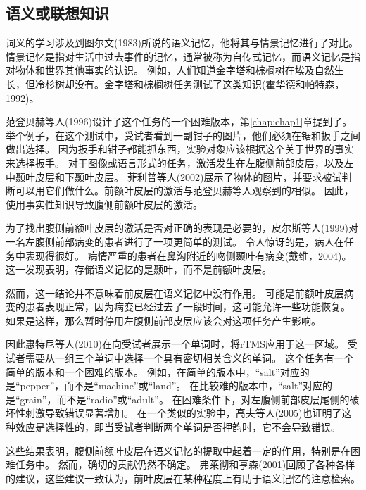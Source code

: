 \subsection{语义或联想知识}
\par
词义的学习涉及到图尔文(1983)所说的语义记忆，他将其与情景记忆进行了对比。
情景记忆是指对生活中过去事件的记忆，通常被称为自传式记忆，而语义记忆是指对物体和世界其他事实的认识。
例如，人们知道金字塔和棕榈树在埃及自然生长，但冷杉树却没有。金字塔和棕榈树任务测试了这类知识(霍华德和帕特森，1992)。
\par


范登贝赫等人(1996)设计了这个任务的一个困难版本，第\ref{chap:chap1}章提到了。
举个例子，在这个测试中，受试者看到一副钳子的图片，他们必须在锯和扳手之间做出选择。
因为扳手和钳子都能抓东西，实验对象应该根据这个关于世界的事实来选择扳手。
对于图像或语言形式的任务，激活发生在左腹侧前部皮层，以及左中颞叶皮层和下颞叶皮层。
菲利普等人(2002)展示了物体的图片，并要求被试判断可以用它们做什么。前额叶皮层的激活与范登贝赫等人观察到的相似。
因此，使用事实性知识导致腹侧前额叶皮层的激活。
\par


为了找出腹侧前额叶皮层的激活是否对正确的表现是必要的，皮尔斯等人(1999)对一名左腹侧前部病变的患者进行了一项更简单的测试。
令人惊讶的是，病人在任务中表现得很好。
病情严重的患者在鼻沟附近的吻侧颞叶有病变(戴维，2004)。
这一发现表明，存储语义记忆的是颞叶，而不是前额叶皮层。
\par


然而，这一结论并不意味着前皮层在语义记忆中没有作用。
可能是前额叶皮层病变的患者表现正常，因为病变已经过去了一段时间，这可能允许一些功能恢复。
如果是这样，那么暂时停用左腹侧前部皮层应该会对这项任务产生影响。
\par


因此惠特尼等人(2010)在向受试者展示一个单词时，将rTMS应用于这一区域。
受试者需要从一组三个单词中选择一个具有密切相关含义的单词。
这个任务有一个简单的版本和一个困难的版本。
例如，在简单的版本中，“salt”对应的是“pepper”，而不是“machine”或“land”。
在比较难的版本中，“salt”对应的是“grain”，而不是“radio”或“adult”。
在困难条件下，对左腹侧前部皮层尾侧的破坏性刺激导致错误显著增加。
在一个类似的实验中，高夫等人(2005)也证明了这种效应是选择性的，即当受试者判断两个单词是否押韵时，它不会导致错误。
\par


这些结果表明，腹侧前额叶皮层在语义记忆的提取中起着一定的作用，特别是在困难任务中。
然而，确切的贡献仍然不确定。
弗莱彻和亨森(2001)回顾了各种各样的建议，这些建议一致认为，前叶皮层在某种程度上有助于语义记忆的注意检索。
\par


